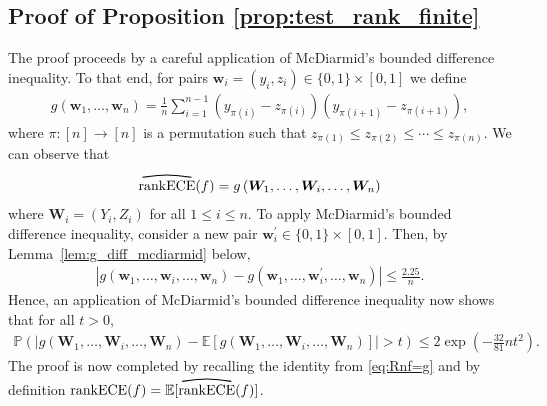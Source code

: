 \documentclass[11pt]{article}
\numberwithin{equation}{section}
\theoremstyle{definition}
\newcommand{\E}{\mathbb{E}}
\renewcommand{\P}{\mathbb{P}}
\newcommand{\bW}{\bm{W}}
\newcommand{\bw}{\bm{w}}
\newcommand{\ra}{\rightarrow}
\newcommand{\myoverline}[2][3.5em]{%
  \overset{%
    \tikz[baseline=-0.1ex]{
      \draw[line width=0.75pt]
        (0,0) .. controls (#1/2,0.5ex) .. (#1,0);
    }%
  }{#2}%
}
\newcommand{\rankECE}{\mathrm{rankECE}}
\newcommand{\hatrankECE}{\myoverline{\rankECE}}
\begin{document}
\subsection{Proof of Proposition \ref{prop:test_rank_finite}}\label{sec:proofof_prop_test_rank_finite}
The proof proceeds by a careful application of McDiarmid's bounded difference inequality. To that end, for pairs $\bw_i = (y_i, z_i)\in \{0,1\}\times [0,1]$ we define
\begin{align*}
    g\left(\bw_1,\ldots, \bw_n\right) = \frac{1}{n}\sum_{i=1}^{n-1}\left(y_{\pi(i)} - z_{\pi(i)}\right)\left(y_{\pi(i+1)} - z_{\pi(i+1)}\right),
\end{align*}
where $\pi:[n]\ra[n]$ is a permutation such that $z_{\pi(1)}\leq z_{\pi(2)}\leq\cdots\leq z_{\pi(n)}$. We can observe that
\begin{align}\label{eq:Rnf=g}
    \hatrankECE(f) = g\left(\bW_1,\ldots,\bW_i,\ldots, \bW_n\right)
\end{align}
where $\bW_i = (Y_i, Z_i)$ for all $1\leq i\leq n$. To apply McDiarmid's bounded difference inequality, consider a new pair $\bw_i^\prime\in \{0,1\}\times [0,1]$. Then, by Lemma~\ref{lem:g_diff_mcdiarmid} below,
\begin{align*}
    \left|g\left(\bw_1,\ldots,\bw_i,\ldots, \bw_n\right) - g\left(\bw_1,\ldots,\bw_i^\prime,\ldots, \bw_n\right)\right|\leq \frac{2.25}{n}.
\end{align*}
Hence, an application of McDiarmid's bounded difference inequality now shows that for all $t>0$,
\begin{align*}
    \P\left(\left|g\left(\bW_1,\ldots,\bW_i,\ldots, \bW_n\right) - \E\left[g\left(\bW_1,\ldots,\bW_i,\ldots, \bW_n\right)\right]\right|>t\right)\leq 2\exp\left(-\frac{32}{81}nt^2\right).
\end{align*}
The proof is now completed by recalling the identity from \eqref{eq:Rnf=g} and by definition $\rankECE(f) = \E[\hatrankECE(f)]$.
\end{document}
